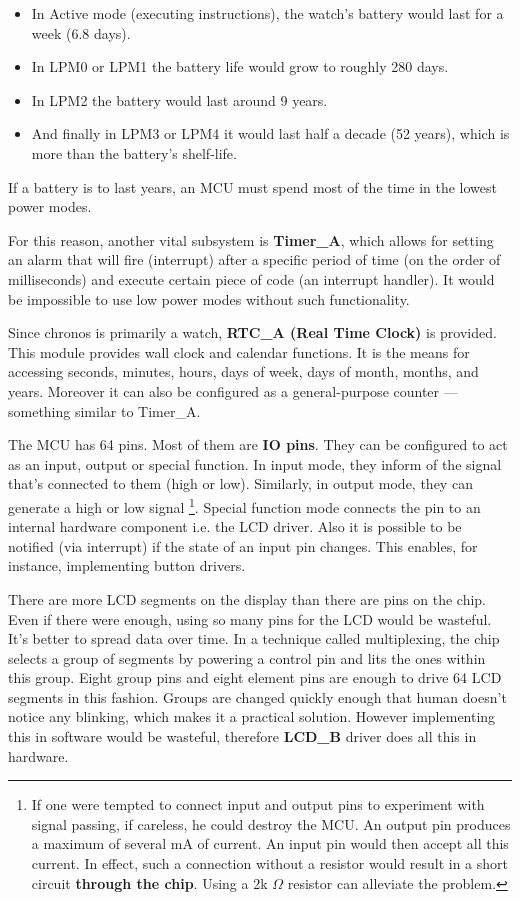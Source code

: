 \begin{itemize}
    \item In Active mode (executing instructions), the watch's battery
      would last for a week (6.8 days).
    \item In LPM0 or LPM1 the battery life would grow to roughly 280 days.
    \item In LPM2 the battery would last around 9 years.
    \item And finally in LPM3 or LPM4 it would last half a decade (52
    years), which is more than the battery's shelf-life.
\end{itemize}
If a battery is to last years, an MCU must spend most of the time in
the lowest power modes.

For this reason, another vital subsystem is {\bf Timer\_A}, which
allows for setting an alarm that will fire (interrupt) after a specific
period of time (on the order of milliseconds) and execute certain
piece of code (an interrupt handler). It would be impossible to use low
power modes without such functionality.

Since chronos is primarily a watch, {\bf RTC\_A (Real Time Clock)} is
provided. This module provides wall clock and calendar functions. It
is the means for accessing seconds, minutes, hours, days of week, days
of month, months, and years.  Moreover it can also be configured as a
general-purpose counter --- something similar to Timer\_A.

The MCU has 64 pins. Most of them are {\bf IO pins}. They can be
configured to act as an input, output or special function.  In input
mode, they inform of the signal that's connected to them (high or
low). Similarly, in output mode, they can generate a high or low
signal \footnote{If one were tempted to connect input and output pins
to experiment with signal passing, if careless, he could destroy the
MCU.  An output pin produces a maximum of several mA of current. An
input pin would then accept all this current. In effect, such a
connection without a resistor would result in a short circuit {\bf
through the chip}. Using a 2k $\Omega$ resistor can alleviate the
problem.}. Special function mode connects the pin to an internal
hardware component i.e.  the LCD driver.  Also it is possible to be
notified (via interrupt) if the state of an input pin changes.  This
enables, for instance, implementing button drivers.

There are more LCD segments on the display than there are pins on the
chip. Even if there were enough, using so many pins for the LCD would
be wasteful. It's better to spread data over time. In a technique
called multiplexing, the chip selects a group of segments by powering
a control pin and lits the ones within this group. Eight group pins
and eight element pins are enough to drive 64 LCD segments in this
fashion. Groups are changed quickly enough that human doesn't notice
any blinking, which makes it a practical solution.  However
implementing this in software would be wasteful, therefore {\bf LCD\_B}
driver does all this in hardware.

